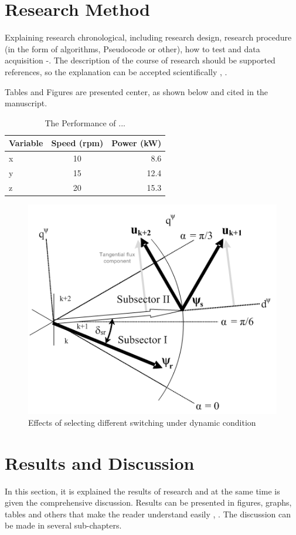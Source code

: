 \documentclass{iaesarticle3}
\begin{document}
\section{Research Method}
\label{}
Explaining research chronological, including research design, research procedure (in the form of algorithms, Pseudocode or other), how to test and data acquisition \cite{Li}-\cite{Zhang}. The description of the course of research should be supported references, so the explanation can be accepted scientifically \cite{Arulmozhiyal}, \cite{Yinhai}.
\par
Tables and Figures are presented center, as shown below and cited in the manuscript.\\

\begin{table}[h]
\caption{The Performance of ...}
\centering
\begin{tabular}{lcr}
\hline
Variable & Speed (rpm) & Power (kW) \\
\hline
x & 10 & 8.6 \\
y & 15 & 12.4 \\
z & 20 & 15.3 \\
\hline
\end{tabular}
\end{table}

\begin{figure}[h]
\centering
\includegraphics[scale=0.5]{figure1}
\caption{Effects of selecting different switching under dynamic condition}
\end{figure}

\section{Results and Discussion}
\label{}
In this section, it is explained the results of research and at the same time is given the comprehensive discussion. Results can be presented in figures, graphs, tables and others that make the reader understand easily \cite{Arulmozhiyal}, \cite{lamport}. The discussion can be made in several sub-chapters.
\end{document}

